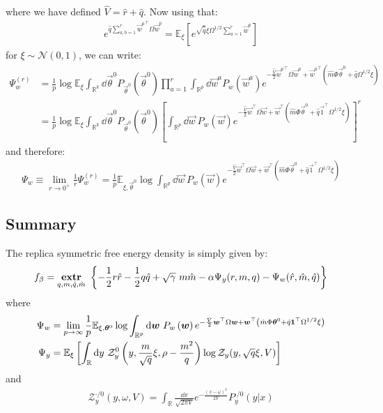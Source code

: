 \documentclass[11pt]{article}
\numberwithin{equation}{section}
\begin{document}
\noindent where we have defined $\hat{V} = \hat{r}+\hat{q}$. Now using that:
\begin{align}
	e^{\hat{q}\sum\limits_{a,b=1}^{r}{\vec{w}^{a}}^{\top}\Omega\vec{w}^{b}} = \mathbb{E}_{\xi}\left[e^{\sqrt{\hat{q}}\xi\Omega^{1/2}\sum\limits_{a=1}^{r}\vec{w}^{a}}\right]
\end{align}
\noindent for $\xi\sim\mathcal{N}(0,1)$, we can write:
\begin{align}
\Psi_{w}^{(r)} &= \frac{1}{p}\log\mathbb{E}_{\xi}\int_{\mathbb{R}^{k}}\dd\vec{\theta}^{0}P_{\vec{\theta}^{0}}\left(\vec{\theta}^{0}\right)\prod\limits_{a=1}^{r}\int_{\mathbb{R}^{p}}\dd\vec{w}^{a}P_{w}\left(\vec{w}^{a}\right) e^{-\frac{\hat{V}}{2}{\vec{w}^{a}}^{\top}\Omega\vec{w}^{a}+{\vec{w}^{a}}^{\top}\left(\hat{m}\Phi\vec{\theta}^{0}+\hat{q}\Omega^{1/2}\xi\right)}\\
&= \frac{1}{p}\log\mathbb{E}_{\xi}\int_{\mathbb{R}^{k}}\dd\vec{\theta}^{0}P_{\vec{\theta}^{0}}\left(\vec{\theta}^{0}\right)\left[\int_{\mathbb{R}^{p}}\dd\vec{w}~P_{w}\left(\vec{w}\right) e^{-\frac{\hat{V}}{2}\vec{w}^{\top}\Omega\vec{w}+\vec{w}^{\top}\left(\hat{m}\Phi\vec{\theta}^{0}+\hat{q}\vec{1}^{\top}\Omega^{1/2}\xi\right)}\right]^{r}
\end{align}
\noindent and therefore:
\begin{align}
\Psi_{w}\equiv \lim\limits_{r\to 0^{+}}\frac{1}{r}\Psi_{w}^{(r)} = \frac{1}{p}\mathbb{E}_{\xi,\vec{\theta}^{0}}\log\int_{\mathbb{R}^{p}}\dd\vec{w}~P_{w}\left(\vec{w}\right) e^{-\frac{\hat{V}}{2}\vec{w}^{\top}\Omega\vec{w}+\vec{w}^{\top}\left(\hat{m}\Phi\vec{\theta}^{0}+\hat{q}\vec{1}^{\top}\Omega^{1/2}\xi\right)}
\end{align}

\subsection*{Summary}
The replica symmetric free energy density is simply given by:
\begin{align}
f_{\beta} = \underset{q,m,\hat{q},\hat{m}}{\textrm{\textbf{extr}}}~\left\{-\frac{1}{2}r\hat{r}-\frac{1}{2}q\hat{q}+\sqrt{\gamma}~m\hat{m}-\alpha \Psi_{y}(r, m,q) -	 \Psi_{w}(\hat{r}, 	\hat{m},\hat{q})\right\}
\label{eq:freeen:final}
\end{align}
\noindent where
\begin{align}
\Psi_{w} &= \lim\limits_{p\to\infty} \frac{1}{p}\mathbb{E}_{\xi,\bm{\theta}^{0}}\log\int_{\mathbb{R}^{p}}\text{d}\bm{w}~P_{w}\left(\bm{w}\right) e^{-\frac{\hat{V}}{2}\bm{w}^{\top}\Omega\bm{w}+\bm{w}^{\top}\left(\hat{m}\Phi\bm{\theta}^{0}+\hat{q}\bm{1}^{\top}\Omega^{1/2}\xi\right)}\notag\\
\Psi_{y} &= \mathbb{E}_{\xi}\left[\int_{\mathbb{R}}\text{d} y~\mathcal{Z}_{y}^{0}\left(y,\frac{m}{\sqrt{q}}\xi, \rho-\frac{m^2}{q}\right)\log\mathcal{Z}_{y}(y,\sqrt{q}\xi,V)\right]
\end{align}
\noindent and 
\begin{align}
\mathcal{Z}_{y}^{\cdot/0}(y,\omega,V) = \int_{\mathbb{R}}\frac{\dd x}{\sqrt{2\pi V}}e^{-\frac{(x-\omega)^2}{2V}}P^{\cdot/0}_{y}(y|x)	
\end{align}
\end{document}
